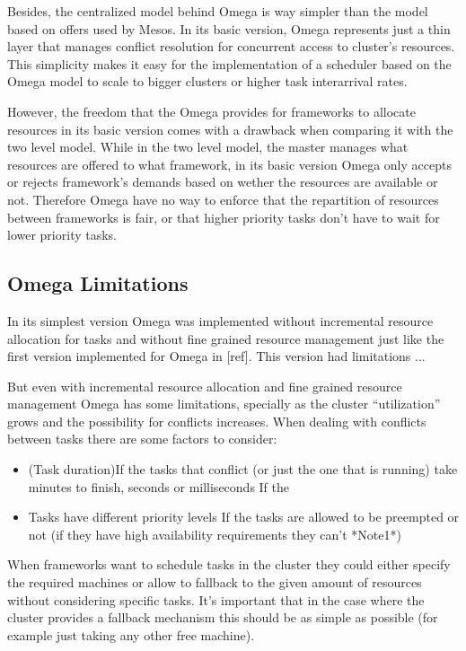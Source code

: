\documentclass{svjour3}                     %
\begin{document}
Besides, the centralized model behind Omega is way simpler than the
model based on offers used by Mesos. In its basic version, Omega
represents just a thin layer that manages conflict resolution for
concurrent access to cluster's resources. This simplicity makes it
easy for the implementation of a scheduler based on the Omega model to
scale to bigger clusters or higher task interarrival rates.

However, the freedom that the Omega provides for frameworks to
allocate resources in its basic version comes with a drawback when
comparing it with the two level model. While in the two level model,
the master manages what resources are offered to what framework, in
its basic version Omega only accepts or rejects framework's demands
based on wether the resources are available or not.  Therefore Omega
have no way to enforce that the repartition of resources between
frameworks is fair, or that higher priority tasks don't have to wait
for lower priority tasks.

\subsection{Omega Limitations}

In its simplest version Omega was implemented without incremental
resource allocation for tasks and without fine grained resource
management just like the first version implemented for Omega in
[ref]. This version had limitations ...

But even with incremental resource allocation and fine grained
resource management Omega has some limitations, specially as the
cluster ``utilization'' grows and the possibility for conflicts
increases. When dealing with conflicts between tasks there are some
factors to consider:

 \begin{itemize}
   \item (Task duration)If the tasks that conflict (or just the one that is
   running) take minutes to finish, seconds or milliseconds If the
  \item Tasks have different priority levels If the tasks are allowed to be
  preempted or not (if they have high availability requirements they
  can't *Note1*)
 \end{itemize}

When frameworks want to schedule tasks in the cluster they could
either specify the required machines or allow to fallback to the given
amount of resources without considering specific tasks. It's important
that in the case where the cluster provides a fallback mechanism this
should be as simple as possible (for example just taking any other
free machine).
\end{document}

